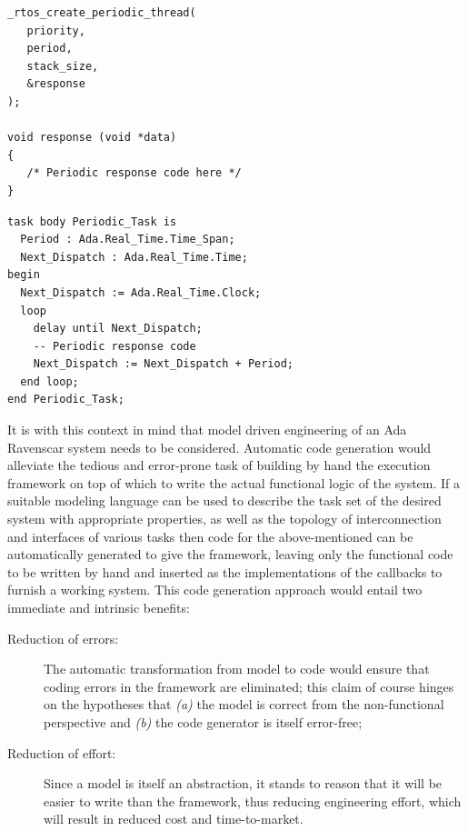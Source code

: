 \begin{minipage}{0.40\linewidth}
\lstset{language=c}
\begin{lstlisting}[label=lst:api_thread, caption = RTOS periodic thread]
_rtos_create_periodic_thread(
   priority, 
   period,
   stack_size, 
   &response
);

void response (void *data)
{
   /* Periodic response code here */
}
\end{lstlisting}
\end{minipage}
\hspace{8mm}
\begin{minipage}{0.50\linewidth}
\lstset{language=ada}
\begin{lstlisting}[label=lst:ada_task, caption=An Ada Ravenscar
    periodic task]
task body Periodic_Task is
  Period : Ada.Real_Time.Time_Span;
  Next_Dispatch : Ada.Real_Time.Time;
begin
  Next_Dispatch := Ada.Real_Time.Clock;
  loop
    delay until Next_Dispatch;
    -- Periodic response code
    Next_Dispatch := Next_Dispatch + Period;
  end loop;
end Periodic_Task;
\end{lstlisting}
\end{minipage}

It is with this context in mind that model driven engineering of an
Ada Ravenscar system needs to be considered. Automatic code generation
would alleviate the tedious and error-prone task of building by hand
the execution framework on top of which to write the actual functional
logic of the system. If a suitable modeling language can be used to
describe the task set of the desired system with appropriate
properties, as well as the topology of interconnection and interfaces
of various tasks then code for the above-mentioned can be
automatically generated to give the framework, leaving only the
functional code to be written by hand and inserted as the
implementations of the callbacks to furnish a working system. This
code generation approach would entail two immediate and intrinsic
benefits:

\begin{description}
\item[Reduction of errors:]{The automatic transformation from model to
  code would ensure that coding errors in the framework are
  eliminated; this claim of course hinges on the hypotheses that
  \emph{(a)} the model is correct from the non-functional perspective
  and \emph{(b)} the code generator is itself error-free;}
\item[Reduction of effort:]{Since a model is itself an abstraction, it
  stands to reason that it will be easier to write than the framework,
  thus reducing engineering effort, which will result in reduced cost
  and time-to-market.}
\end{description}

